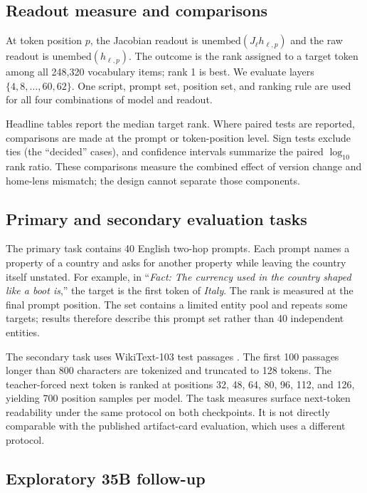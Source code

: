 \documentclass[10pt,a4paper,twocolumn]{article}
\begin{document}
\subsection{Readout measure and comparisons}

At token position $p$, the Jacobian readout is
$\mathrm{unembed}(J_\ell h_{\ell,p})$ and the raw readout is
$\mathrm{unembed}(h_{\ell,p})$. The outcome is the rank assigned to a target
token among all 248{,}320 vocabulary items; rank 1 is best. We evaluate layers
$\{4,8,\ldots,60,62\}$. One script, prompt set, position set, and ranking rule
are used for all four combinations of model and readout.

Headline tables report the median target rank. Where paired tests are
reported, comparisons are made at the prompt or token-position level. Sign
tests exclude ties (the ``decided'' cases), and confidence intervals summarize
the paired $\log_{10}$ rank ratio. These comparisons measure the combined
effect of version change and home-lens mismatch; the design cannot separate
those components.

\subsection{Primary and secondary evaluation tasks}

The primary task contains 40 English two-hop prompts. Each prompt names a
property of a country and asks for another property while leaving the country
itself unstated. For example, in ``\emph{Fact: The currency used in the country
shaped like a boot is},'' the target is the first token of \emph{Italy}. The
rank is measured at the final prompt position. The set contains a limited
entity pool and repeats some targets; results therefore describe this prompt
set rather than 40 independent entities.

The secondary task uses WikiText-103 test passages
\citep{merity2016pointer}. The first 100 passages longer than 800 characters
are tokenized and truncated to 128 tokens. The teacher-forced next token is
ranked at positions 32, 48, 64, 80, 96, 112, and 126, yielding 700 position
samples per model. The task measures surface next-token readability under the
same protocol on both checkpoints. It is not directly comparable with the
published artifact-card evaluation, which uses a different protocol.

\subsection{Exploratory 35B follow-up}
\label{sec:35b-methods}
\end{document}
